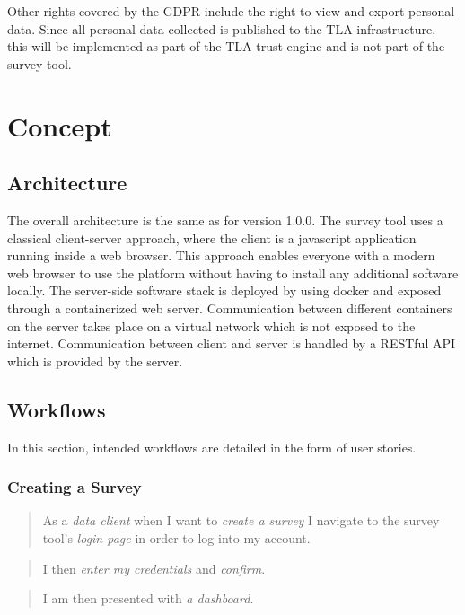 \documentclass[a4paper,11pt]{article}
\begin{document}
            Other rights covered by the GDPR include the right to view and export personal data.
            Since all personal data collected is published to the TLA infrastructure,
            this will be implemented as part of the TLA trust engine and is not
            part of the survey tool.


        \section{Concept}

            \subsection{Architecture}
                The overall architecture is the same as for version 1.0.0. The survey tool
                uses a classical client-server approach, where the client is a 
                javascript application running inside a web browser. This approach
                enables everyone with a modern web browser to use the platform without
                having to install any additional software locally. The server-side software stack
                is deployed by using docker and exposed through a containerized web server.
                Communication between different containers on the server takes place
                on a virtual network which is not exposed to the internet. Communication
                between client and server is handled by a RESTful API which is provided
                by the server.

            \subsection{Workflows}

                In this section, intended workflows are detailed in the form of user stories. 

                \subsubsection{Creating a Survey}
                    \begin{quote}
                        As a \textit{data client} when I want to \textit{create a survey}
                        I navigate to the survey tool's \textit{login page} in order
                        to log into my account.
                    \end{quote}
                    \begin{quote}
                        I then \textit{enter my credentials} and \textit{confirm}.
                    \end{quote}
                    \begin{quote}
                        I am then presented with \textit{a dashboard}.
                    \end{quote}
\end{document}
